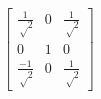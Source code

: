  $\begin{bmatrix} \frac{1}{√2} & 0 & \frac{1}{√2} \\ 0 & 1 & 0 \\ \frac{-1}{√2} & 0 & \frac{1}{√2} \end{bmatrix}$ 